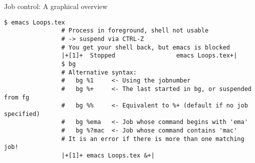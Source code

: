 \begin{frame}[fragile]{Job control: A graphical overview}
\begin{overlayarea}{\textwidth}{0.7\textheight}
\begin{onlyenv}
\begin{lstlisting}[style=MyBash, xrightmargin=2mm, xleftmargin=2mm, firstnumber=26]
                $ emacs Loops.tex
                # Process in foreground, shell not usable
                # -> suspend via CTRL-Z
                # You get your shell back, but emacs is blocked
                |+[1]+  Stopped                 emacs Loops.tex+|
                $ bg
                # Alternative syntax:
                #   bg %1     <- Using the jobnumber
                #   bg %+     <- The last started in bg, or suspended from fg
                #   bg %%     <- Equivalent to %+ (default if no job specified)
                #   bg %ema   <- Job whose command begins with 'ema'
                #   bg %?mac  <- Job whose command contains 'mac'
                # It is an error if there is more than one matching job!
                |+[1]+ emacs Loops.tex &+|
            \end{lstlisting}
        \end{onlyenv}
    \end{overlayarea}
\end{frame}
